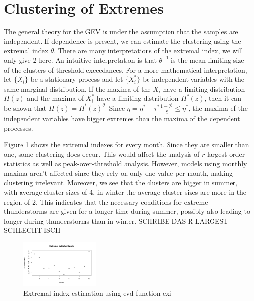 \documentclass[10pt,conference,compsocconf]{IEEEtran}
\begin{document}
\section*{Clustering of Extremes}
The general theory for the GEV is under the assumption that the samples are independent. If dependence is present, we can estimate the clustering using the extremal index $\theta$. There are many interpretations of the extremal index, we will only give 2 here. An intuitive interpretation is that $\theta^{-1}$ is the mean limiting size of the clusters of threshold exceedances. For a more mathematical interpretation, let $\{X_i\}$ be a stationary process and let  $\{X_i^*\}$ be independent variables with the same marginal distribution. If the maxima of the $X_i$ have a limiting distribution $H(z)$ and the maxima of $X_i^*$ have a limiting distribution $H^*(z)$, then it can be shown that $H(z)=H^*(z)^\theta$. Since $\eta=\eta^*-\tau^*\frac{1-\theta^\xi}{\xi}\leq\eta^*$, the maxima of the independent variables have bigger extremes than the maxima of the dependent processes. 
\par
Figure \ref{fig:extremal_index} shows the extremal indexes for every month. Since they are smaller than one, some clustering does occur. This would affect the analysis of $r$-largest order statistics as well as peak-over-threshold analysis. However, models using monthly maxima aren't affected since they rely on only one value per month, making clustering irrelevant. Moreover, we see that the clusters are bigger in summer, with average cluster sizes of 4, in winter the average cluster sizes are more in the region of 2. This indicates that the necessary conditions for extreme thunderstorms are given for a longer time during summer, possibly also leading to longer-during thunderstorms than in winter. 
SCHRIBE DAS R LARGEST SCHLECHT ISCH

\begin{figure}
	\centering
	\includegraphics[width=0.35\textwidth]{../plots/extermal_index.pdf}
	\caption{Extremal index estimation using evd function exi}
	\label{fig:extremal_index}
\end{figure}
\end{document}
